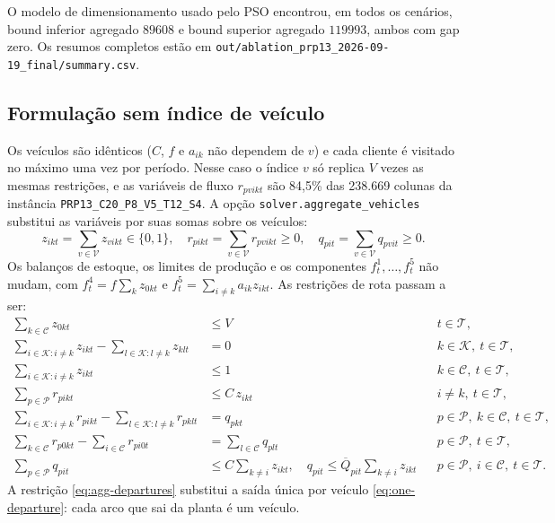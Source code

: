 \documentclass[11pt,a4paper]{article}
\newcommand{\set}[1]{\mathcal{#1}}
\begin{document}
O modelo de dimensionamento usado pelo PSO encontrou, em todos os cenários,
bound inferior agregado $89608$ e bound superior agregado $119993$, ambos com
gap zero. Os resumos completos estão em
\texttt{out/ablation\_prp13\_2026-09-19\_final/summary.csv}.

\subsection{Formulação sem índice de veículo}
\label{sec:vehicle-free}

Os veículos são idênticos ($C$, $f$ e $a_{ik}$ não dependem de $v$) e cada
cliente é visitado no máximo uma vez por período. Nesse caso o índice $v$ só
replica $V$ vezes as mesmas restrições, e as variáveis de fluxo $r_{pvikt}$
são 84,5\% das 238.669 colunas da instância \texttt{PRP13\_C20\_P8\_V5\_T12\_S4}.
A opção \texttt{solver.aggregate\_vehicles} substitui as variáveis por suas
somas sobre os veículos:
\begin{equation}
  z_{ikt}=\sum_{v\in\set{V}}z_{vikt}\in\{0,1\},\quad
  r_{pikt}=\sum_{v\in\set{V}}r_{pvikt}\ge0,\quad
  q_{pit}=\sum_{v\in\set{V}}q_{pvit}\ge0.
  \label{eq:aggregated-variables}
\end{equation}
Os balanços de estoque, os limites de produção e os componentes
$f_t^1,\ldots,f_t^5$ não mudam, com $f_t^4=f\sum_{k}z_{0kt}$ e
$f_t^5=\sum_{i\ne k}a_{ik}z_{ikt}$. As restrições de rota passam a ser:
\begin{align}
  \sum_{k\in\set{C}}z_{0kt}&\le V
    && t\in\set{T}, \label{eq:agg-departures}\\
  \sum_{i\in\set{K}:i\ne k}z_{ikt}-\sum_{l\in\set{K}:l\ne k}z_{klt}&=0
    && k\in\set{K},\ t\in\set{T}, \label{eq:agg-flow}\\
  \sum_{i\in\set{K}:i\ne k}z_{ikt}&\le1
    && k\in\set{C},\ t\in\set{T}, \label{eq:agg-visit}\\
  \sum_{p\in\set{P}}r_{pikt}&\le C\,z_{ikt}
    && i\ne k,\ t\in\set{T}, \label{eq:agg-capacity}\\
  \sum_{i\in\set{K}:i\ne k}r_{pikt}-\sum_{l\in\set{K}:l\ne k}r_{pklt}&=q_{pkt}
    && p\in\set{P},\ k\in\set{C},\ t\in\set{T}, \label{eq:agg-product-flow}\\
  \sum_{k\in\set{C}}r_{p0kt}-\sum_{i\in\set{C}}r_{pi0t}
    &=\sum_{l\in\set{C}}q_{plt}
    && p\in\set{P},\ t\in\set{T}, \label{eq:agg-plant-flow}\\
  \sum_{p\in\set{P}}q_{pit}&\le C\sum_{k\ne i}z_{ikt},\quad
  q_{pit}\le\overline Q_{pit}\sum_{k\ne i}z_{ikt}
    && p\in\set{P},\ i\in\set{C},\ t\in\set{T}. \label{eq:agg-delivery}
\end{align}
A restrição \eqref{eq:agg-departures} substitui a saída única por veículo
\eqref{eq:one-departure}: cada arco que sai da planta é um veículo.
\end{document}
